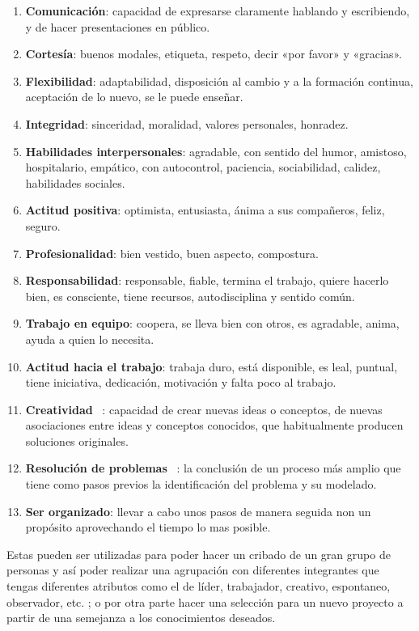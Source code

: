 \begin{enumerate}
    \item \textbf{Comunicación}: capacidad de expresarse claramente hablando y escribiendo, y de hacer presentaciones en público.
    \item \textbf{Cortesía}: buenos modales, etiqueta, respeto, decir «por favor» y «gracias».
    \item \textbf{Flexibilidad}: adaptabilidad, disposición al cambio y a la formación continua, aceptación de lo nuevo, se le puede enseñar.
    \item \textbf{Integridad}: sinceridad, moralidad, valores personales, honradez.
    \item \textbf{Habilidades interpersonales}: agradable, con sentido del humor, amistoso, hospitalario, empático, con autocontrol, paciencia, sociabilidad, calidez, habilidades sociales.
    \item \textbf{Actitud positiva}: optimista, entusiasta, ánima a sus compañeros, feliz, seguro.
    \item \textbf{Profesionalidad}: bien vestido, buen aspecto, compostura.
    \item \textbf{Responsabilidad}: responsable, fiable, termina el trabajo, quiere hacerlo bien, es consciente, tiene recursos, autodisciplina y sentido común.
    \item \textbf{Trabajo en equipo}: coopera, se lleva bien con otros, es agradable, anima, ayuda a quien lo necesita.
    \item\textbf{Actitud hacia el trabajo}: trabaja duro, está disponible, es leal, puntual, tiene iniciativa, dedicación, motivación y falta poco al trabajo.
    \item \textbf{Creatividad} ~\cite{wiki:Creatividad}: capacidad de crear nuevas ideas o conceptos, de nuevas asociaciones entre ideas y conceptos conocidos, que habitualmente producen soluciones originales.
    \item \textbf{Resolución de problemas} ~\cite{wiki:ResProblemas}: la conclusión de un proceso más amplio que tiene como pasos previos la identificación del problema y su modelado.
    \item \textbf{Ser organizado}: llevar a cabo unos pasos de manera seguida non un propósito aprovechando el tiempo lo mas posible.
\end{enumerate}
Estas pueden ser utilizadas para poder hacer un cribado de un gran grupo de personas y así poder realizar una agrupación con diferentes integrantes que tengas diferentes atributos como el de líder, trabajador, creativo, espontaneo, observador, etc. ; o por otra parte hacer una selección para un nuevo proyecto a partir de una semejanza a los conocimientos deseados.
~\cite{softskillsacademy}
